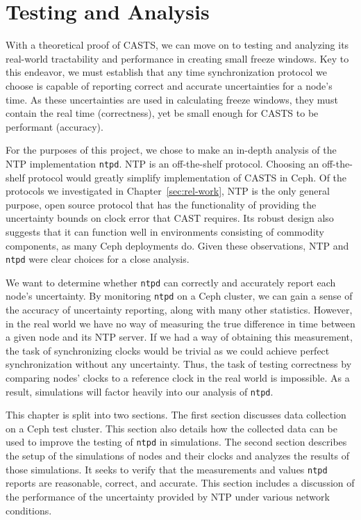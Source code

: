 \chapter{Testing and Analysis}
\label{sec:results}


With a theoretical proof of CASTS, we can move on to testing
and analyzing its real-world tractability and performance in creating
small freeze windows.  Key to
this endeavor, we must establish that any time synchronization
protocol we choose is capable of reporting correct and accurate
uncertainties for a node's time. As these uncertainties are used in
calculating freeze windows, they must contain the real time
(correctness), yet be small enough for CASTS to be performant
(accuracy).

For the purposes of this project, we chose to make an in-depth
analysis of the NTP implementation \texttt{ntpd}. NTP is an
off-the-shelf protocol. Choosing an off-the-shelf protocol would
greatly simplify implementation of CASTS in Ceph. Of the
protocols we investigated in Chapter~\ref{sec:rel-work}, NTP is the
only general purpose, open source protocol that has the
functionality of providing the uncertainty bounds on clock error 
that CAST requires. Its robust
design also suggests that it can function well in environments
consisting of commodity components, as many Ceph deployments do. 
Given these observations, NTP and \texttt{ntpd} were
clear choices for a close analysis.

We want to determine whether \texttt{ntpd} can correctly and
accurately report each node's uncertainty. By monitoring \texttt{ntpd}
on a Ceph cluster, we can gain a sense of the accuracy of uncertainty
reporting, along with many other statistics. However, in the real
world we have no way of measuring the true difference in time
between a given node and its NTP server. If we had a way of obtaining
this measurement, the task of synchronizing clocks would be trivial
as we could achieve perfect synchronization without any uncertainty.
Thus, the task of testing correctness by comparing nodes' clocks to a
reference clock in the real
world is impossible. As a result, simulations will factor heavily into
our analysis of \texttt{ntpd}.

This chapter is split into two sections. The first section discusses
data collection on a Ceph test cluster. This section also details how
the collected data can be used to improve the testing of \texttt{ntpd}
in simulations.  The second section describes the setup of the
simulations of nodes and their clocks and analyzes the results of those
simulations. It seeks to verify that the measurements and values
\texttt{ntpd} reports are reasonable, correct, and accurate. This
section includes a discussion of the performance of the uncertainty
provided by NTP under various network
conditions.

